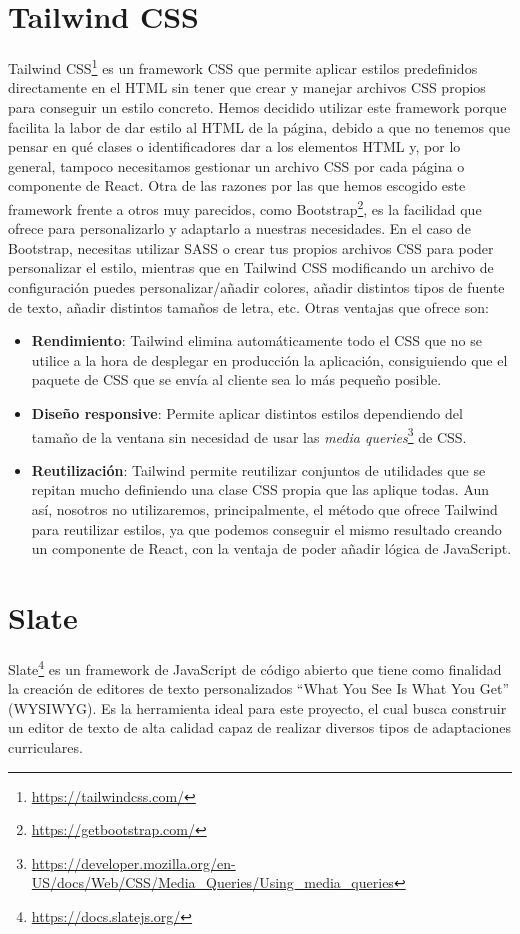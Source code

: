 \section{Tailwind CSS}\label{sec:tailwind}
Tailwind CSS\footnote{\url{https://tailwindcss.com/}} es un framework CSS que permite aplicar estilos predefinidos directamente en el HTML sin tener que crear y manejar archivos CSS propios para conseguir un estilo concreto. Hemos decidido utilizar este framework porque facilita la labor de dar estilo al HTML de la página, debido a que no tenemos que pensar en qué clases o identificadores dar a los elementos HTML y, por lo general, tampoco necesitamos gestionar un archivo CSS por cada página o componente de React. Otra de las razones por las que hemos escogido este framework frente a otros muy parecidos, como Bootstrap\footnote{\url{https://getbootstrap.com/}}, es la facilidad que ofrece para personalizarlo y adaptarlo a nuestras necesidades. En el caso de Bootstrap, necesitas utilizar SASS o crear tus propios archivos CSS para poder personalizar el estilo, mientras que en Tailwind CSS modificando un archivo de configuración puedes personalizar/añadir colores, añadir distintos tipos de fuente de texto, añadir distintos tamaños de letra, etc. Otras ventajas que ofrece son:
\begin{itemize}
  \item \textbf{Rendimiento}: Tailwind elimina automáticamente todo el CSS que no se utilice a la hora de desplegar en producción la aplicación, consiguiendo que el paquete de CSS que se envía al cliente sea lo más pequeño posible.
  \item \textbf{Diseño responsive}: Permite aplicar distintos estilos dependiendo del tamaño de la ventana sin necesidad de usar las \textit{media queries}\footnote{\url{https://developer.mozilla.org/en-US/docs/Web/CSS/Media_Queries/Using_media_queries}} de CSS.
  \item \textbf{Reutilización}: Tailwind permite reutilizar conjuntos de utilidades que se repitan mucho definiendo una clase CSS propia que las aplique todas. Aun así, nosotros no utilizaremos, principalmente, el método que ofrece Tailwind para reutilizar estilos, ya que podemos conseguir el mismo resultado creando un componente de React, con la ventaja de poder añadir lógica de JavaScript.
\end{itemize}

\section{Slate}\label{sec:Slate}
Slate\footnote{\url{https://docs.slatejs.org/}} es un framework de JavaScript de código abierto que tiene como finalidad la creación de editores de texto personalizados ``What You See Is What You Get'' (WYSIWYG). Es la herramienta ideal para este proyecto, el cual busca construir un editor de texto de alta calidad capaz de realizar diversos tipos de adaptaciones curriculares.

